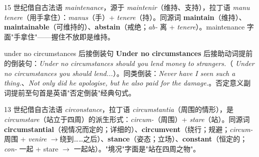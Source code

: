 \documentclass[../main.tex]{subfiles}
\begin{document}

\begin{origin}
15 世纪借自古法语 \textit{maintenance}，源于 \textit{maintenir}（维持、支持），拉丁语 \textit{manu tenere}（用手拿住）：\textit{manus}（手）+ \textit{tenere}（持）。同源词 \textbf{maintain}（维持）、\textbf{maintainable}（可维持的）、\textbf{abstain}（戒绝；\textit{ab-} 离 + \textit{tenere}）。maintenance 字面"手拿住"——握住不放即是维持。
\end{origin}




\begin{gram}{under no circumstances 后接倒装句}
\textbf{Under no circumstances} 后接助动词提前的倒装句：\textit{Under no circumstances should you lend money to strangers.}（ \textit{Under no circumstances you should lend...}）。同类倒装：\textit{Never have I seen such a thing.}、\textit{Not only did he apologise, but he also paid for the damage.}。否定意义副词提前至句首是英语"否定倒装"经典句式。
\end{gram}

\begin{origin}
13 世纪借自古法语 \textit{circonstance}，拉丁语 \textit{circumstantia}（周围的情形），是 \textit{circumstare}（站立于四周）的派生形式：\textit{circum-}（周围）+ \textit{stare}（站）。同源词 \textbf{circumstantial}（视情况而定的；详细的）、\textbf{circumvent}（绕行；规避；\textit{circum-} 周围 + \textit{venire} $\to$绕到……之后）、\textbf{stance}（姿态；立场）、\textbf{constant}（恒定的；\textit{con-} 一起 + stare $\to$ 一起站）。"境况"字面是"站在四周之物"。
\end{origin}

\end{document}
